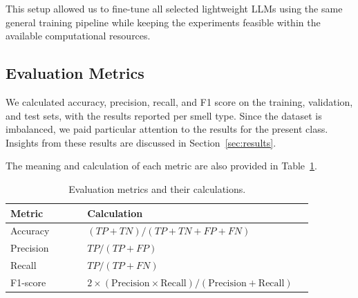 This setup allowed us to fine-tune all selected lightweight LLMs using the same general training pipeline while keeping the experiments feasible within the available computational resources.

\subsection{Evaluation Metrics}
\label{subsec:evaluation-metrics}

We calculated accuracy, precision, recall, and F1 score on the training, validation, and test sets, with the results reported per smell type. Since the dataset is imbalanced, we paid particular attention to the results for the present class. Insights from these results are discussed in Section~\ref{sec:results}.

The meaning and calculation of each metric are also provided in Table~\ref{tab:evaluation-metrics}.

\begin{table}[t]
\caption{Evaluation metrics and their calculations.}
\label{tab:evaluation-metrics}
\centering
\begin{tabular}{>{\raggedright\arraybackslash}p{0.24\linewidth}>{\raggedright\arraybackslash}p{0.63\linewidth}}
\hline
Metric & Calculation \\
\hline
Accuracy & $(TP + TN) / (TP + TN + FP + FN)$ \\
Precision & $TP / (TP + FP)$ \\
Recall & $TP / (TP + FN)$ \\
F1-score & $2 \times (\text{Precision} \times \text{Recall}) / (\text{Precision} + \text{Recall})$ \\
\hline
\end{tabular}
\end{table}
